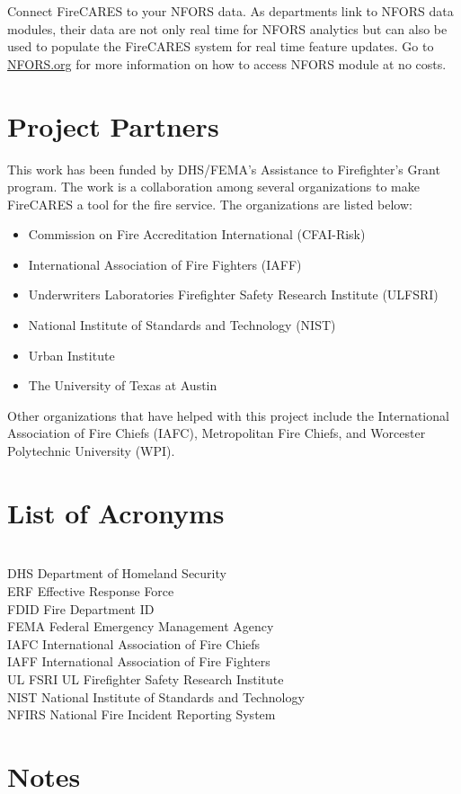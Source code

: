 \documentclass[12pt,oneside]{book}
\begin{document}
Connect FireCARES to your NFORS data. As departments link to NFORS data modules, their data are not only real time for NFORS analytics but can also be used to populate the FireCARES system for real time feature updates. Go to \href{https://nfors.org}{NFORS.org} for more information on how to access NFORS module at no costs.

\chapter{Project Partners}

This work has been funded by DHS/FEMA's Assistance to Firefighter's Grant program. The work is a collaboration among several organizations to make FireCARES a tool for the fire service. The organizations are listed below:

\begin{itemize}
\item Commission on Fire Accreditation International (CFAI-Risk)
\item International Association of Fire Fighters (IAFF)
\item Underwriters Laboratories Firefighter Safety Research Institute (ULFSRI)
\item National Institute of Standards and Technology (NIST)
\item Urban Institute
\item The University of Texas at Austin
\end{itemize}

Other organizations that have helped with this project include the International Association of Fire Chiefs (IAFC), Metropolitan Fire Chiefs, and Worcester Polytechnic University (WPI).

\chapter{List of Acronyms}

\begin{tabbing}
\hspace{1.5in} \= \\

DHS \> Department of Homeland Security \\
ERF \> Effective Response Force \\
FDID \> Fire Department ID \\
FEMA \> Federal Emergency Management Agency \\
IAFC \> International Association of Fire Chiefs \\
IAFF \> International Association of Fire Fighters \\
UL FSRI \> UL Firefighter Safety Research Institute \\
NIST \> National Institute of Standards and Technology  \\
NFIRS \> National Fire Incident Reporting System \\
\end{tabbing}



\chapter*{Notes}
\end{document}
